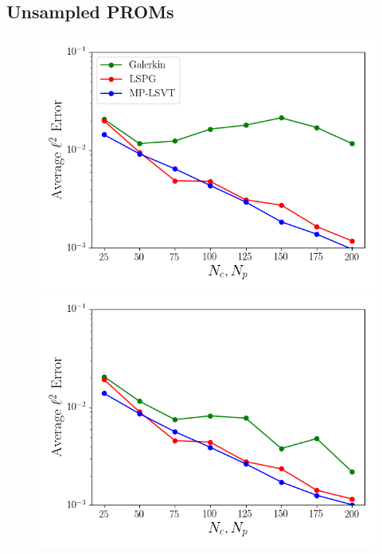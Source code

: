 \subsection{Unsampled PROMs}

\begin{figure}
	\begin{minipage}{0.49\linewidth}
		\includegraphics[width=0.99\linewidth]{Chapters/CavityAndCVRC/Images/cavity/unsampled/unsampled_dt1e-6_Average_errorRaw.png}
		\subcaption{$\dt = \dtFOM$}
	\end{minipage}
	\begin{minipage}{0.49\linewidth}
		\includegraphics[width=0.99\linewidth]{Chapters/CavityAndCVRC/Images/cavity/unsampled/unsampled_dt2p5e-6_Average_errorRaw.png}
		\subcaption{$\dt = 2.5 \times \dtFOM$}
	\end{minipage}


\end{figure}
